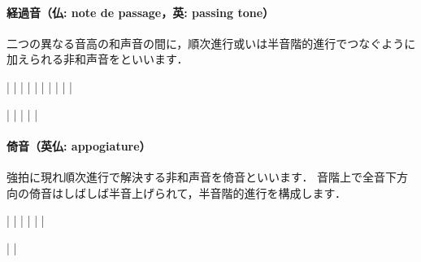 \documentclass[dvipdfmx,uplatex,b5paper,openany,jbase=12Q,nomag*,textwidth-limit=44%
               ]{gachimuchi}
\begin{document}
\paragraph{経過音（仏: note de passage，英: passing tone）}
二つの異なる音高の和声音の間に，順次進行或いは半音階的進行でつなぐように加えられる非和声音をといいます．
\begin{Music}
  \generalmeter{\meterC}%
  \Startpiece%
  \NOtes%
  |\zchordsu{\Cross}%
  \en\NOTes%
  |%
  \en\doublebar%
  \NOtes%
  |\zchordsu{\Cross}%
  \en\NOTes%
  |%
  \en\doublebar%
  \NOtes%
  |\zchordsu{\Cross}%
  \en\NOTes%
  |%
  \en\doublebar%
  \NOtes%
  |\zchordsu{\Cross}%
  \en\NOTes%
  |%
  \en\doublebar%
  \NOtes%
  |\zchordsu{\Cross}\zchordsu{\Cross}%
  \en\doublebar%
  \NOtes%
  |\zchordsu{\Cross}\zchordsu{\Cross}%
  \en\setdoublebar%
  \endpiece%
\end{Music}
\begin{Music}[.6\linewidth]
  \generalmeter{\meterC}%
  \Startpiece%
  \NOtes%
  |%
  \en\NOTes%
  |%
  \en\doublebar%
  \NOtes%
  |%
  \en\Notes%
  |%
  \en\NOTes%
  |%
  \en\setdoublebar%
  \endpiece%
\end{Music}

\paragraph{倚音（英仏: appogiature）}
強拍に現れ順次進行で解決する非和声音を倚音といいます．
音階上で全音下方向の倚音はしばしば半音上げられて，半音階的進行を構成します．
\begin{Music}
  \generalmeter{\meterC}%
  \Startpiece%
  \NOTes%
  |\zchordsu{\Cross}%
  \en\doublebar%
  \NOTes%
  |\zchordsu{\Cross}%
  \en\doublebar%
  \NOTes%
  |\zchordsu{\Cross}%
  \en\doublebar%
  \NOTes%
  |\zchordsu{\Cross}%
  \en\doublebar%
  \NOTes%
  |\zchordsu{\Cross}%
  \en\doublebar%
  \NOTes%
  |\zchordsu{\Cross}%
  \en\setdoublebar%
  \endpiece%
\end{Music}
\begin{Music}[.6\linewidth]
  \generalmeter{\meterC}%
  \Startpiece%
  \NOtes%
  |%
  \en\doublebar%
  \NOtes%
  |%
  \en\setdoublebar%
  \endpiece%
\end{Music}
\end{document}
